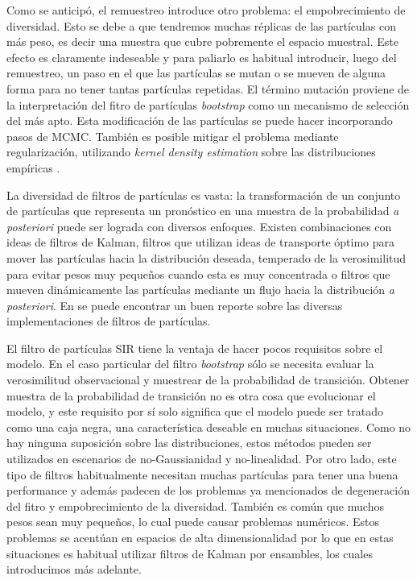 Como se anticipó, el remuestreo introduce otro problema: el empobrecimiento de diversidad. Esto se debe a que tendremos muchas réplicas de las partículas con más peso, es decir una muestra que cubre pobremente el espacio muestral. Este efecto es claramente indeseable y para paliarlo es habitual introducir, luego del remuestreo, un paso en el que las partículas se mutan o se mueven de alguna forma para no tener tantas partículas repetidas. El término mutación proviene de la interpretación del fitro de partículas \textit{bootstrap} como un mecanismo de selección del más apto. Esta modificación de las partículas se puede hacer incorporando pasos de MCMC. También es posible mitigar el problema mediante regularización, utilizando \textit{kernel density estimation} sobre las distribuciones empíricas \citep{Sarkka2013, Arulampalam2002, Ruchi2019}.

La diversidad de filtros de partículas es vasta: la transformación de un conjunto de partículas que representa un pronóstico en una muestra de la probabilidad \textit{a posteriori} puede ser lograda con diversos enfoques. Existen combinaciones con ideas de filtros de Kalman, filtros que utilizan ideas de transporte óptimo para mover las partículas hacia la distribución deseada, temperado de la verosimilitud para evitar pesos muy pequeños cuando esta es muy concentrada o filtros que mueven dinámicamente las partículas mediante un flujo hacia la distribución \textit{a posteriori}. En \cite{vanLeeuwen2019} se puede encontrar un buen reporte sobre las diversas implementaciones de filtros de partículas. 

El filtro de partículas SIR tiene la ventaja de hacer pocos requisitos sobre el modelo. En el caso particular del filtro \textit{bootstrap} sólo se necesita evaluar la verosimilitud observacional y muestrear de la probabilidad de transición. Obtener muestra de la probabilidad de transición no es otra cosa que evolucionar el modelo, y este requisito por sí solo significa que el modelo puede ser tratado como una caja negra, una característica deseable en muchas situaciones. Como no hay ninguna suposición sobre las distribuciones, estos métodos pueden ser utilizados en escenarios de no-Gaussianidad y no-linealidad. Por otro lado, este tipo de filtros habitualmente necesitan muchas partículas para tener una buena performance y además padecen de los problemas ya mencionados de degeneración del fitro y empobrecimiento de la diversidad. También es común que muchos pesos sean muy pequeños, lo cual puede causar problemas numéricos. Estos problemas se acentúan en espacios de alta dimensionalidad por lo que en estas situaciones es habitual utilizar filtros de Kalman por ensambles, los cuales introducimos más adelante.

